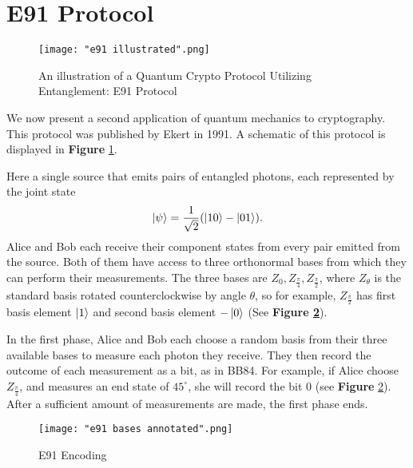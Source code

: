 \section{E91 Protocol} \label{section: e91}
\begin{figure}[h]
    \centering
    \texttt{[image: "e91 illustrated".png]}
    \caption{An illustration of a Quantum Crypto Protocol Utilizing Entanglement: E91 Protocol \protect\footnotemark}
    \label{fig:E91 Illustrated}
\end{figure}


We now present a second application of quantum mechanics to cryptography.  This protocol was published by Ekert in 1991\cite{Ekert1991}.  A schematic of this protocol is displayed in {\bf{Figure}} \ref{fig:E91 Illustrated}.  

Here a single source that emits pairs of entangled photons, each represented by the joint state 
$$\ket{\psi}= \frac{1}{\sqrt{2}}(\ket{10}-\ket{01}).$$
Alice and Bob each receive their component states from every pair emitted from the source. Both of them have access to three orthonormal bases from which they can perform their measurements.  The three bases are $Z_0, Z_{\frac{\pi}{4}}, Z_{\frac{\pi}{2}}$, where $Z_\theta$ is the standard basis rotated counterclockwise by angle $\theta$, so for example, $Z_{\frac{\pi}{2}}$ has first basis element $\ket{1}$ and second basis element $-\ket{0}$ (See \textbf{Figure \ref{fig:e91 encoding}}).


In the first phase, Alice and Bob each choose a random basis from their three available bases to measure each photon they receive. They then record the outcome of each measurement as a bit, as in BB84.  For example, if Alice choose $Z_{\frac{\pi}{4}}$, and measures an end state of $45^\circ$, she will record the bit $0$ (see {\bf{Figure}} \ref{fig:e91 encoding}).  After a sufficient amount of measurements are made, the first phase ends.  

\begin{figure}[h]
    \centering
    \texttt{[image: "e91 bases annotated".png]}
    \caption{E91 Encoding}
    \label{fig:e91 encoding}
\end{figure}



